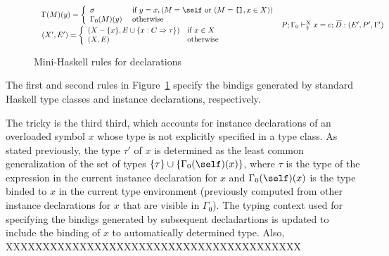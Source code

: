 \begin{figure}
\begin{mdframed}
\[\begin{array}{cc}
{\begin{array}{l}
           \Gamma(M)(y) = \left\{ \begin{array}{ll}
                                    \sigma & \text{ if } y = x, (M = \self \text{ or }
                                                                 (M = \texttt{[]}, x \in X)) \\
                                      \Gamma_0(M)(y) & \text{ otherwise } 
                                   \end{array}\right.\\[.3cm]                   
           (X',E') = \left\{ \begin{array}{ll}
                               (X - \{ x \}, E \cup \{x : C\Rightarrow\tau\}) 
                                   & \text{if } x \in X\\
                               (X, E) & \text{otherwise} 
                             \end{array}\right. 
          \end{array}}
	 {P;\Gamma_0 \vdash_{\Uparrow}^X x = e;\: \overline{\!D} : (E',P',\Gamma')} 
\end{array} \]
\end{mdframed} \vspace{-.2cm}
\caption{Mini-Haskell rules for declarations}
\label{fig:mini-haskell-rules-for-declarations}
\end{figure}

The first and second rules in Figure~\ref{fig:mini-haskell-rules-for-declarations} specify the bindigs generated by standard Haskell type classes and instance declarations, respectively. 

The tricky is the third third, which accounts for instance declarations of an overloaded symbol $x$ whose type is not explicitly specified in a type class. As stated previously, the type $\tau'$ of $x$ is determined as the least common generalization of the set of types $\{\tau\} \cup \{\Gamma_0(\self)(x)\}$, where $\tau$ is the type of the expression in the current instance declaration for $x$ and  $\Gamma_0(\self)(x)$ is the type binded to $x$ in the current type environment (previously computed from other instance declarations for $x$ that are visible in $\Gamma_0$). The typing context used for specifying the bindigs generated by subsequent decladartions is updated to include the binding of $x$ to automatically determined type. Also, XXXXXXXXXXXXXXXXXXXXXXXXXXXXXXXXXXXXXXXX

